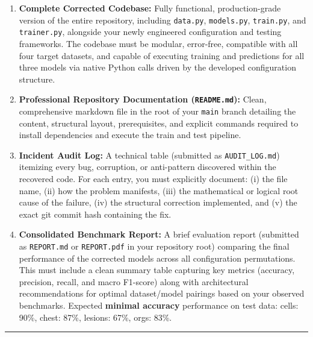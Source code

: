 \documentclass[11pt,a4paper]{article}
\begin{document}
\begin{enumerate}
    \item \textbf{Complete Corrected Codebase:} Fully functional, production-grade version of the entire repository, including \texttt{data.py}, \texttt{models.py}, \texttt{train.py}, and \texttt{trainer.py}, alongside your newly engineered configuration and testing frameworks. The codebase must be modular, error-free, compatible with all four target datasets, and capable of executing training and predictions for all three models via native Python calls driven by the developed configuration structure.
    \item \textbf{Professional Repository Documentation (\texttt{README.md}):}
    Clean, comprehensive markdown file in the root of your \texttt{main} branch detailing the content, structural layout, prerequisites, and explicit commands required to install dependencies and execute the train and test pipeline.
    \item \textbf{Incident Audit Log:} A technical table (submitted as \texttt{AUDIT\_LOG.md}) itemizing every bug, corruption, or anti-pattern discovered within the recovered code. For each entry, you must explicitly document: (i) the file name, (ii) how the problem manifests, (iii) the mathematical or logical root cause of the failure, (iv) the structural correction implemented, and (v) the exact git commit hash containing the fix.
    \item \textbf{Consolidated Benchmark Report:} A brief evaluation report (submitted as \texttt{REPORT.md} or \texttt{REPORT.pdf} in your repository root) comparing the final performance of the corrected models across all configuration permutations. This must include a clean summary table capturing key metrics (accuracy, precision, recall, and macro F1-score) along with architectural recommendations for optimal dataset/model pairings based on your observed benchmarks. Expected \textbf{minimal accuracy} performance on test data: cells: 90\%, chest: 87\%, lesions: 67\%, orgs: 83\%.
\end{enumerate}

\vspace{0.4cm}
\hrule
\end{document}
